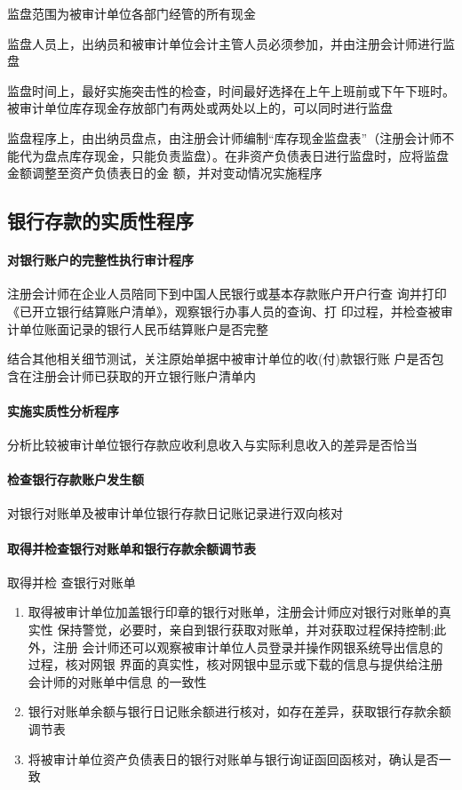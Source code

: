 \documentclass[UTF8,12pt]{ctexart}
\numberwithin{equation}{section} %
\numberwithin{figure}{section}
\numberwithin{table}{section}
\begin{document}
	监盘范围为被审计单位各部门经管的所有现金
	
	监盘人员上，出纳员和被审计单位会计主管人员必须参加，并由注册会计师进行监盘
	
	监盘时间上，最好实施突击性的检查，时间最好选择在上午上班前或下午下班时。被审计单位库存现金存放部门有两处或两处以上的，可以同时进行监盘
	
	监盘程序上，由出纳员盘点，由注册会计师编制“库存现金监盘表”（注册会计师不能代为盘点库存现金，只能负责监盘）。在非资产负债表日进行监盘时，应将监盘金额调整至资产负债表日的金 额，并对变动情况实施程序
	
	\subsection{银行存款的实质性程序}
	\paragraph{对银行账户的完整性执行审计程序}
	注册会计师在企业人员陪同下到中国人民银行或基本存款账户开户行查 询并打印《已开立银行结算账户清单》，观察银行办事人员的查询、打 印过程，并检查被审计单位账面记录的银行人民币结算账户是否完整 
	
	结合其他相关细节测试，关注原始单据中被审计单位的收(付)款银行账 户是否包含在注册会计师已获取的开立银行账户清单内
	
	\paragraph{实施实质性分析程序}
	分析比较被审计单位银行存款应收利息收入与实际利息收入的差异是否恰当
	
	\paragraph{检查银行存款账户发生额}
	对银行对账单及被审计单位银行存款日记账记录进行双向核对
	
	\paragraph{取得并检查银行对账单和银行存款余额调节表}
	取得并检 查银行对账单
	\begin{enumerate}
		\item 取得被审计单位加盖银行印章的银行对账单，注册会计师应对银行对账单的真实性 保持警觉，必要时，亲自到银行获取对账单，并对获取过程保持控制;此外，注册 会计师还可以观察被审计单位人员登录并操作网银系统导出信息的过程，核对网银 界面的真实性，核对网银中显示或下载的信息与提供给注册会计师的对账单中信息 的一致性 
		
		\item 银行对账单余额与银行日记账余额进行核对，如存在差异，获取银行存款余额调节表 
		
		\item 将被审计单位资产负债表日的银行对账单与银行询证函回函核对，确认是否一致
	\end{enumerate}
	
\end{document}
